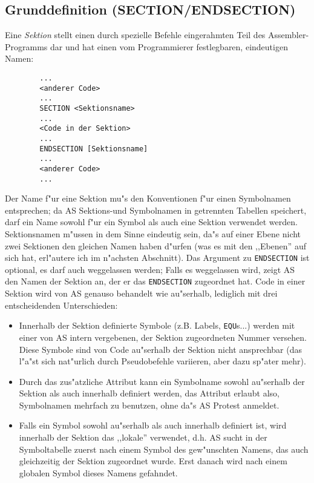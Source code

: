 \documentclass[12pt,a4paper,twoside]{report}
\newcommand{\ii}[1]{{\it #1}}
\newcommand{\tty}[1]{{\tt #1}}
\begin{document}

\subsection{Grunddefinition (SECTION/ENDSECTION)}

Eine \ii{Sektion} stellt einen durch spezielle Befehle eingerahmten
Teil des Assembler-Programms dar und hat einen vom Programmierer
festlegbaren, eindeutigen Namen:
\begin{verbatim}
        ...
        <anderer Code>
        ...
        SECTION <Sektionsname>
        ...
        <Code in der Sektion>
        ...
        ENDSECTION [Sektionsname]
        ...
        <anderer Code>
        ...
\end{verbatim}
Der Name f"ur eine Sektion mu"s den Konventionen f"ur einen Symbolnamen
entsprechen; da AS Sektions-und Symbolnamen in getrennten Tabellen speichert,
darf ein Name sowohl f"ur ein Symbol als auch eine Sektion verwendet werden.
Sektionsnamen m"ussen in dem Sinne eindeutig sein, da"s auf einer Ebene
nicht zwei Sektionen den gleichen Namen haben d"urfen (was es mit den
,,Ebenen'' auf sich hat, erl"autere ich im n"achsten Abschnitt).  Das Argument
zu \tty{ENDSECTION} ist optional, es darf auch weggelassen werden; Falls
es weggelassen wird, zeigt AS den Namen der Sektion an, der er das
\tty{ENDSECTION} zugeordnet hat.  Code in einer Sektion wird von AS genauso
behandelt wie au"serhalb, lediglich mit drei entscheidenden Unterschieden:
\begin{itemize}
\item{Innerhalb der Sektion definierte Symbole (z.B. Labels, \tty{EQU}s...) werden
      mit einer von AS intern vergebenen, der Sektion zugeordneten Nummer
      versehen.  Diese Symbole sind von Code au"serhalb der Sektion nicht
      ansprechbar (das l"a"st sich nat"urlich durch Pseudobefehle variieren,
      aber dazu sp"ater mehr).}
\item{Durch das zus"atzliche Attribut kann ein Symbolname sowohl au"serhalb
      der Sektion als auch innerhalb definiert werden, das Attribut erlaubt
      also, Symbolnamen mehrfach zu benutzen, ohne da"s AS Protest anmeldet.}
\item{Falls ein Symbol sowohl au"serhalb als auch innerhalb definiert ist,
      wird innerhalb der Sektion das ,,lokale'' verwendet, d.h. AS sucht
      in der Symboltabelle zuerst nach einem Symbol des gew"unschten Namens,
      das auch gleichzeitig der Sektion zugeordnet wurde.  Erst danach wird
      nach einem globalen Symbol dieses Namens gefahndet.}
\end{itemize}
\end{document}
